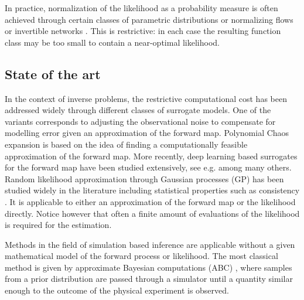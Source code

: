 \documentclass{amsart}
\theoremstyle{definition}
\begin{document}
In practice, normalization of the likelihood as a probability measure is often achieved through certain classes of parametric distributions \cite{lueckmann2019likelihoodfree, Balaji2017SimpleandScalable} or normalizing flows \cite{papamakarios2019sequantialneural, rothfuss2019conditional} or invertible networks \cite{radev2020bayesflowlearningcomplexstochastic}. This is restrictive: in each case the resulting function class may be too small to contain a near-optimal likelihood.



\subsection{State of the art}\label{ss:SoA}
In the context of inverse problems, the restrictive computational cost has been addressed widely through different classes of surrogate models. One of the variants corresponds to adjusting the observational noise to compensate for modelling error \cite{Arridge_2006, kaipio2006statistical, Helin2025OAE} given an approximation of the forward map. Polynomial Chaos expansion \cite{Marzouk2009Astochastic, MARZOUK2009Dimensionality, Xiu2010} is based on the idea of finding a computationally feasible approximation of the forward map. More recently, deep learning based surrogates for the forward map have been studied extensively, see e.g. \cite{Herrmann_2020,AnAdaptive2020, Li2023PINNsurrogate, Deveny2023DeepSurrogate} among many others.
Random likelihood approximation through Gaussian processes (GP) has been studied widely in the literature including statistical properties such as consistency
\cite{stuart2018PosteriorConsistency, Helin2024IntrotoGPR}. It is applicable to either an approximation of the forward map or the likelihood directly. Notice however that often a finite amount of evaluations of the likelihood is required for the estimation. 

Methods in the field of simulation based inference are applicable without a given mathematical model of the forward process or likelihood. The most classical method is given by approximate Bayesian computations (ABC) \cite{Rubin1984, Marin2012, Sisson2007Sequential}, where samples from a prior distribution are passed through a simulator until a quantity similar enough to the outcome of the physical experiment is observed.
\end{document}
